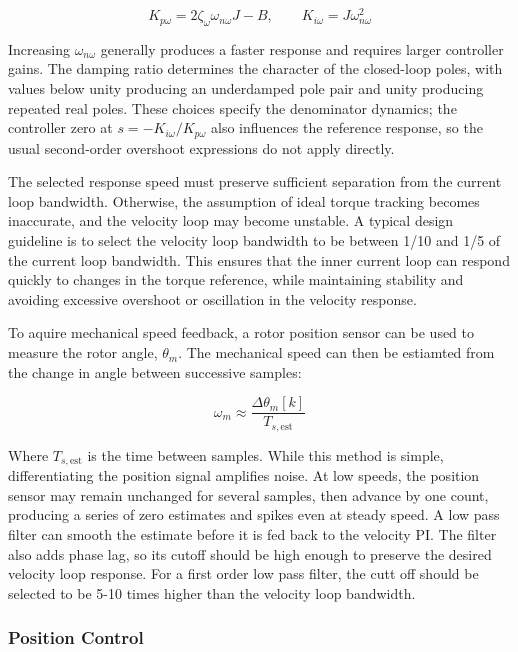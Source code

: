 \documentclass{article}
\begin{document}
\begin{equation}
    K_{p\omega} = 2\zeta_\omega\omega_{n\omega}J-B, \qquad
    K_{i\omega} = J\omega_{n\omega}^2
\end{equation}

Increasing $\omega_{n\omega}$ generally produces a faster response and requires larger controller gains. The damping ratio determines the character of the closed-loop poles, with values below unity producing an underdamped pole pair and unity producing repeated real poles. These choices specify the denominator dynamics; the controller zero at $s=-K_{i\omega}/K_{p\omega}$ also influences the reference response, so the usual second-order overshoot expressions do not apply directly.

The selected response speed must preserve sufficient separation from the current loop bandwidth. Otherwise, the assumption of ideal torque tracking becomes inaccurate, and the velocity loop may become unstable. A typical design guideline is to select the velocity loop bandwidth to be between 1/10 and 1/5 of the current loop bandwidth. This ensures that the inner current loop can respond quickly to changes in the torque reference, while maintaining stability and avoiding excessive overshoot or oscillation in the velocity response.

To aquire mechanical speed feedback, a rotor position sensor can be used to measure the rotor angle, $\theta_m$. The mechanical speed can then be estiamted from the change in angle between successive samples:

\begin{equation}
    \omega_m \approx \frac{\Delta\theta_m[k]}{T_{s,\mathrm{est}}}
\end{equation}

Where $T_{s,\mathrm{est}}$ is the time between samples. While this method is simple, differentiating the position signal amplifies noise. At low speeds, the position sensor may remain unchanged for several samples, then advance by one count, producing a series of zero estimates and spikes even at steady speed. A low pass filter can smooth the estimate before it is fed back to the velocity PI. The filter also adds phase lag, so its cutoff should be high enough to preserve the desired velocity loop response. For a first order low pass filter, the cutt off should be selected to be 5-10 times higher than the velocity loop bandwidth.


\subsubsection{Position Control}
\label{sec:position-control}
\end{document}
